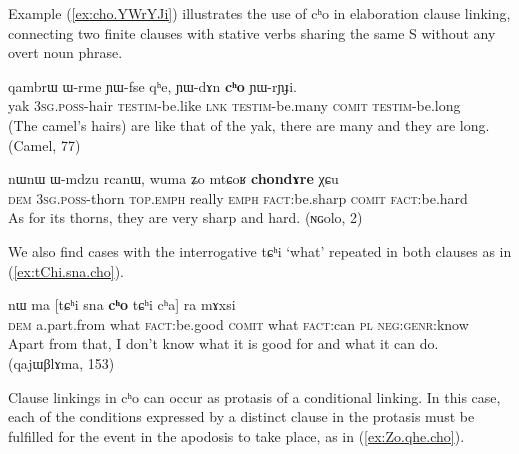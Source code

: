 \documentclass[oldfontcommands,oneside,a4paper,11pt]{article}
\newcommand{\ipa}[1]{{\phon \mbox{#1}}} %
\newcommand{\refb}[1]{(\ref{#1})}
\begin{document}
Example \refb{ex:cho.YWrYJi} illustrates the use of \ipa{cʰo} in elaboration clause linking, connecting two finite clauses with stative verbs sharing the same S without any overt noun phrase.

\begin{exe}
\ex \label{ex:cho.YWrYJi}
\gll
\ipa{qambrɯ}  	\ipa{ɯ-rme}  	\ipa{ɲɯ-fse}  	\ipa{qʰe,}  	\ipa{ɲɯ-dɤn}  	\ipa{\textbf{cʰo}}  	\ipa{ɲɯ-rɲɟi.}  \\
yak \textsc{3sg.poss}-hair \textsc{testim}-be.like \textsc{lnk} \textsc{testim}-be.many \textsc{comit} \textsc{testim}-be.long \\
\glt (The camel's hairs) are like that of the yak, there are many and they are long. (Camel, 77)
\end{exe}

\begin{exe}
\ex \label{ex:chondAre}
\gll
\ipa{nɯnɯ}  	\ipa{ɯ-mdzu}  	\ipa{rcanɯ,}  	\ipa{wuma}  	\ipa{ʑo}  	\ipa{mtɕoʁ}  	\ipa{\textbf{chondɤre}}  	\ipa{χɕu}  \\
\textsc{dem} \textsc{3sg.poss}-thorn \textsc{top.emph} really \textsc{emph} \textsc{fact}:be.sharp \textsc{comit} \textsc{fact}:be.hard \\
\glt As for its thorns, they are very sharp and hard. (ɴɢolo, 2)
\end{exe}

We also find cases with the interrogative  \ipa{tɕʰi} `what' repeated in both clauses as  in \refb{ex:tChi.sna.cho}.

\begin{exe}
\ex \label{ex:tChi.sna.cho}
\gll
\ipa{nɯ}  	\ipa{ma}  	[\ipa{tɕʰi}  	\ipa{sna}  	\ipa{\textbf{cʰo}}  	\ipa{tɕʰi}  	\ipa{cʰa}]  	\ipa{ra}  	\ipa{mɤxsi}  \\
\textsc{dem} a.part.from what \textsc{fact}:be.good \textsc{comit} what \textsc{fact}:can \textsc{pl} \textsc{neg:genr}:know\\
\glt Apart from that, I don't know what it is good for and what it can do. (qajɯβlɤma, 153)
\end{exe}

Clause linkings in \ipa{cʰo} can occur as protasis of a conditional linking. In this case, each of the conditions expressed by a distinct clause in the protasis must be fulfilled for the event in the apodosis to take place, as in \refb{ex:Zo.qhe.cho}.
\end{document}
